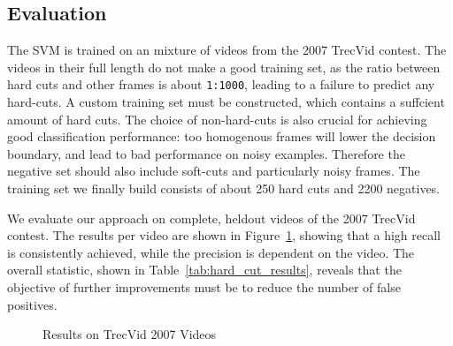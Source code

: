 \FloatBarrier
\subsection{Evaluation}
\label{sec:hard_cut_evaluation}




The SVM is trained on an mixture of videos from the 2007 TrecVid contest.
The videos in their full length do not make a good training set, as the ratio between hard cuts and other frames is about \texttt{1:1000}, leading to a failure to predict any hard-cuts.
A custom training set must be constructed, which contains a suffcient amount of hard cuts.
The choice of non-hard-cuts is also crucial for achieving good classification performance: too homogenous frames will lower the decision boundary, and lead to bad performance on noisy examples.
Therefore the negative set should also include soft-cuts and particularly noisy frames.
The training set we finally build consists of about 250 hard cuts and 2200 negatives.


We evaluate our approach on complete, heldout videos of the 2007 TrecVid contest. The results per video are shown in Figure~\ref{fig:scatterplothceval}, showing that a high recall is consistently achieved, while the precision is dependent on the video. The overall statistic, shown in Table~\ref{tab:hard_cut_results},  reveals that the objective of further improvements must be to reduce the number of false positives.

\begin{figure}
\centering
{}
\caption{Results on TrecVid 2007 Videos}
\label{fig:scatterplothceval}
\end{figure}

